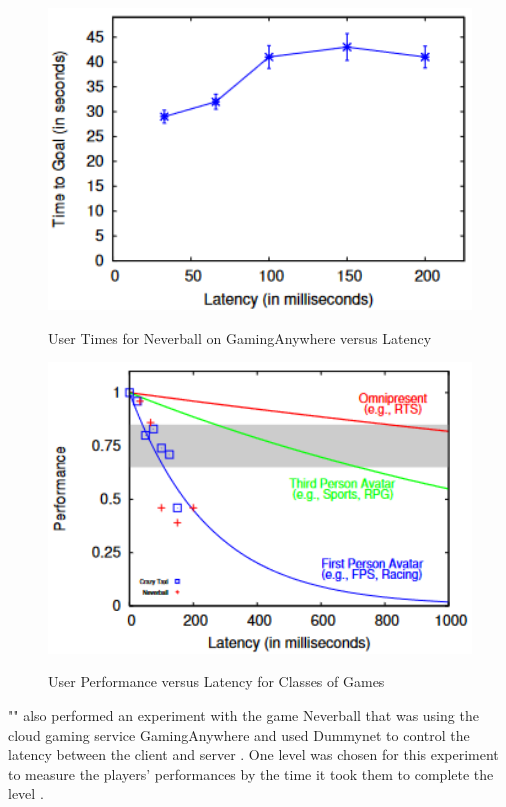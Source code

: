 \begin{figure}[H]
	\centering
	\includegraphics[width=12cm]{../img/fig23.png}
	\caption{User Times for Neverball on GamingAnywhere versus Latency}
	\parencite[Chapter 4, Figure 7]{claypool2014effects}
\end{figure}
\begin{figure}[H]
	\centering
	\includegraphics[width=12cm]{../img/fig24.png}
	\caption{User Performance versus Latency for Classes of Games}
	\parencite[Chapter 4, Figure 8]{claypool2014effects}
\end{figure}
"\textcite{anouna2014network}" also performed an experiment with the game Neverball that was using the cloud gaming service GamingAnywhere and used Dummynet to control the latency between the client and server \parencite[Chapter 3.2, Page 6]{anouna2014network}. One level was chosen for this experiment to measure the players' performances by the time it took them to complete the level \parencite[Chapter 4.1, Page 15]{anouna2014network}.
